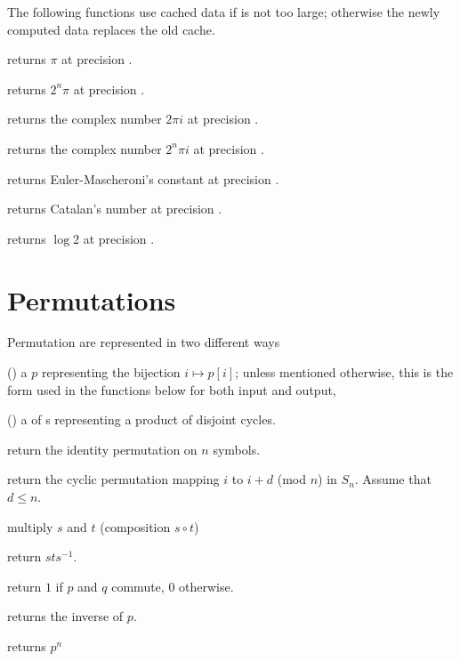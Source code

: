 The following functions use cached data if  is not too large;
otherwise the newly computed data replaces the old cache.

 returns $\pi$ at precision .

 returns $2^n\pi$ at precision .

 returns the complex number $2\pi i$ at
precision .

 returns the complex number $2^n\pi i$ at
precision .

 returns Euler-Mascheroni's constant at
precision .

 returns Catalan's number at precision .

 returns $\log 2$ at precision .



\section{Permutations }

\noindent Permutation are represented in two different ways

\item () a  $p$ representing the bijection $i\mapsto
p[i]$; unless mentioned otherwise, this is the form used in the functions
below for both input and output,

\item () a  of s representing a product of
disjoint cycles.

 return the identity permutation on $n$
symbols.

 return the cyclic permutation mapping
$i$ to $i+d$ (mod $n$) in $S_n$. Assume that $d \leq n$.

 multiply $s$ and $t$ (composition $s\circ t$)

 return $sts^{-1}$.

 return $1$ if $p$ and $q$ commute, 0
otherwise.

 returns the inverse of $p$.

 returns $p^n$

